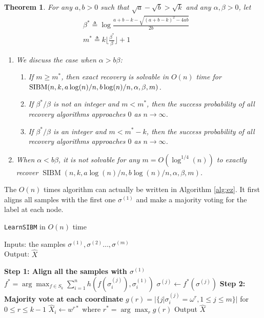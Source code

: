 \documentclass[conference]{IEEEtran}
\newtheorem{theorem}{Theorem}%
\DeclareMathOperator{\SIBM}{SIBM}
\begin{document}
\begin{theorem} \label{thm:wt1}
For any $a,b> 0$ such that $\sqrt{a}-\sqrt{b}> \sqrt{k}$ and any $\alpha,\beta>0$, let
\begin{align} \label{eq:defstar}
&\beta^\ast \triangleq
\log\frac{a+b-k-\sqrt{(a+b-k)^2-4ab}}{2 b}  \\
&m^\ast \triangleq k \Big\lfloor \frac{\beta^\ast}{\beta} \Big\rfloor +1 
\end{align}
\begin{enumerate}
	\item We discuss the case when $\alpha > b \beta$:
	\begin{enumerate}
	\item If $m\ge m^\ast$, then exact recovery is solvable in $O(n)$ time for $\SIBM(n,k, a\log(n)/n, \linebreak[4] b\log(n)/n,\alpha,\beta,m)$.
	\item If $\beta^\ast/\beta$ is not an integer and $m < m^\ast$, then the success probability of all recovery algorithms approaches $0$ as $n\to\infty$.
	\item If $\beta^\ast/\beta$ is an integer and $m < m^\ast - k$, then the success probability of all recovery algorithms approaches $0$ as $n\to\infty$.
	\end{enumerate}
	\item When $\alpha < b \beta$, it is not solvable for any $m=O(\log^{1/4}(n))$ to exactly recover $\SIBM(n,k, a\log(n)/n, b\log(n)/n,\alpha,\beta,m)$.
\end{enumerate}

\end{theorem}
The $O(n)$ times algorithm can actually be written in Algorithm \ref{alg:ez}. It first aligns all samples with the first one $\sigma^{(1)}$ and
make a majority voting for the label at each node.
\begin{algorithm}
	\caption{\texttt{LearnSIBM} in $O(n)$ time} \label{alg:ez}
	Inputs: the samples $\sigma^{(1)},\sigma^{(2)}\dots,\sigma^{(m)}$ \\
	Output: $\hat{X}$
	\begin{algorithmic}[1]
		\Statex 
		{\bf Step 1: Align all the samples with $\sigma^{(1)}$ }
		\State $f^* = \arg\max_{f \in S_k} \sum_{i=1}^n h(f(\sigma^{(j)}_i), \sigma^{(1)}_i)$
		\State $\sigma^{(j)} \gets f^*(\sigma^{(j)})$
		\EndFor
		\Statex
		{\bf Step 2: Majority vote at each coordinate}
		\State $g(r) = |\{j | \sigma^{(j)}_i = \omega^r,1\leq j \leq m\}|$  for $ 0 \leq r \leq k-1$
		\State $\hat{X}_i \gets w^{r*}$ where $r^*=\arg\max_r g(r)$
		\State{}
		\EndFor
		\State Output $\hat{X}$
	\end{algorithmic}
\end{algorithm}
\end{document}
